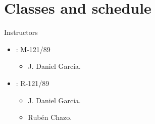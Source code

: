 \section{Classes and schedule}

\begin{frame}[t]{Instructors}
\begin{itemize}
  \item {}: M-121/89
    \begin{itemize}
      \item J. Daniel Garcia.
    \end{itemize}
  \item {}: R-121/89
    \begin{itemize}
      \item J. Daniel Garcia.
      \item Rubén Chazo.
    \end{itemize}
\end{itemize}
\end{frame}

